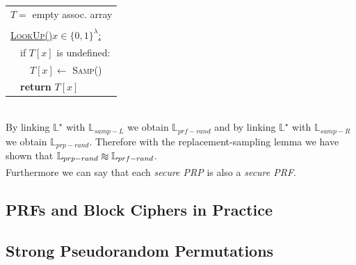 \documentclass{article}
\def\apeqA{\SavedStyle\sim}
\def\apeq{\setstackgap{L}{\dimexpr.5pt+1.5\LMpt}\ensurestackMath{%
  \ThisStyle{\mathrel{\Centerstack{{\apeqA} {\apeqA} {\apeqA}}}}}}
\begin{document}
\begin{adjustwidth}{2em}{2em}
\begin{adjustwidth}{2em}{2em}
\begin{adjustwidth}{2em}{}
\begin{center}
\begin{tabular}{|l|}
							\hline
							$T =$ empty assoc. array \\
							\\
							\underline{\textsc{LookUp}()$x \in \{ 0,1 \} ^{\lambda}$:} \\
							\ \ if $T[x]$ is undefined: \\
							\ \ \ \ $T[x] \leftarrow$ \textsc{Samp}() \\
							\ \ \textbf{return} $T[x]$ \\ 
							\hline			
						\end{tabular}
					\end{center}
					\hfill \\
					By linking $\mathbb{L}^{\star}$ with $\mathbb{L}_{samp-L}$ we obtain $\mathbb{L}_{prf-rand}$ and by linking $\mathbb{L}^{\star}$ with $\mathbb{L}_{samp-R}$ we obtain $\mathbb{L}_{prp-rand}$. Therefore with the replacement-sampling lemma we have shown that $\mathbb{L}_{prp-rand} \apeq \mathbb{L}_{prf-rand}$. \\
					Furthermore we can say that each \textit{secure PRP} is also a \textit{secure PRF}.
				\end{adjustwidth}
			\end{adjustwidth}
			\subsection{PRFs and Block Ciphers in Practice}
			\begin{adjustwidth}{2em}{2em}
			\end{adjustwidth}
			\subsection{Strong Pseudorandom Permutations}
			\begin{adjustwidth}{2em}{2em}
			\end{adjustwidth}
		\end{adjustwidth}
		\newpage 
\end{document}
